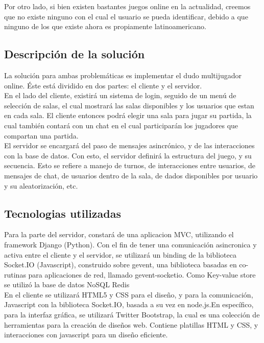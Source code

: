 \documentclass[a4paper,11pt]{article}
\begin{document}
	Por otro lado, si bien existen bastantes juegos online en la actualidad,
creemos que no existe ninguno con el cual el usuario se pueda identificar,
debido a que ninguno de los que existe ahora es propiamente latinoamericano. 

\subsection{Descripción de la solución}
	
	La solución para ambas problemáticas es implementar el dudo 
multijugador online. Éste está dividido en dos partes: el cliente y el servidor.
\\

	En el lado del cliente, existirá un sistema de login, seguido de un 
menú de selección de salas, el cual mostrará las salas disponibles y los 
usuarios que estan en cada sala. El cliente entonces podrá elegir una sala 
para jugar su partida, la cual también contará con un chat en el cual 
participarán los jugadores que compartan una partida.\\

	El servidor se encargará del paso de mensajes asincrónico, y de las
interacciones con la base de datos. Con esto, el servidor definirá la 
estructura del juego, y su secuencia. Esto se refiere a manejo de turnos, 
de interacciones entre usuarios, de mensajes de chat, de usuarios dentro de 
la sala, de dados disponibles por usuario y su aleatorización, etc.
	

\subsection{Tecnologias utilizadas}
Para la parte del servidor, constará de una aplicacion MVC, utilizando el framework
Django (Python). Con el fin de tener una comunicación asincronica y activa entre
el cliente y el servidor, se utilizará un binding de la biblioteca Socket.IO (Javascript),
construido sobre gevent, una biblioteca basadas en co-rutinas para aplicaciones de red, llamado
gevent-socketio. Como Key-value store se utilizó la base de datos NoSQL Redis\\

En el cliente se utilizará HTML5 y CSS para el diseño, y para la comunicación, Javascript
con la biblioteca Socket.IO, basada a su vez en node.js.En específico, para 
 la interfaz gráfica, se utilizará Twitter Bootstrap, la cual es una colección
de herramientas para la creación de diseños web. Contiene platillas HTML y CSS,
y interacciones con javascript para un diseño eficiente. \\
\end{document}
